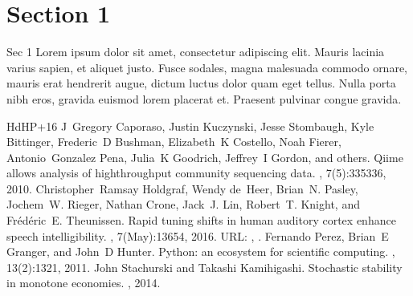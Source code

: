 \section{Section 1}
\label{\detokenize{part2/sec1:section-1}}\label{\detokenize{part2/sec1::doc}}
\sphinxAtStartPar
Sec 1 Lorem ipsum dolor sit amet, consectetur adipiscing elit. Mauris lacinia varius sapien, et aliquet justo. Fusce sodales, magna malesuada commodo ornare, mauris erat hendrerit augue, dictum luctus dolor quam eget tellus. Nulla porta nibh eros, gravida euismod lorem placerat et. Praesent pulvinar congue gravida.

\begin{sphinxthebibliography}{HdHP+16}
\sphinxAtStartPar
J Gregory Caporaso, Justin Kuczynski, Jesse Stombaugh, Kyle Bittinger, Frederic D Bushman, Elizabeth K Costello, Noah Fierer, Antonio Gonzalez Pena, Julia K Goodrich, Jeffrey I Gordon, and others. Qiime allows analysis of high\sphinxhyphen{}throughput community sequencing data. , 7(5):335\textendash{}336, 2010.
\sphinxAtStartPar
Christopher Ramsay Holdgraf, Wendy de Heer, Brian N. Pasley, Jochem W. Rieger, Nathan Crone, Jack J. Lin, Robert T. Knight, and Frédéric E. Theunissen. Rapid tuning shifts in human auditory cortex enhance speech intelligibility. , 7(May):13654, 2016. URL: , .
\sphinxAtStartPar
Fernando Perez, Brian E Granger, and John D Hunter. Python: an ecosystem for scientific computing. , 13(2):13\textendash{}21, 2011.
\sphinxAtStartPar
John Stachurski and Takashi Kamihigashi. Stochastic stability in monotone economies. , 2014.
\end{sphinxthebibliography}



\renewcommand{\indexname}{Index}
\printindex
